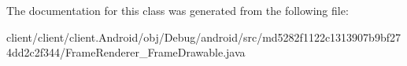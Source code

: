 The documentation for this class was generated from the following file\+:\begin{DoxyCompactItemize}
\item 
client/client/client.\+Android/obj/\+Debug/android/src/md5282f1122c1313907b9bf274dd2c2f344/Frame\+Renderer\+\_\+\+Frame\+Drawable.\+java\end{DoxyCompactItemize}
